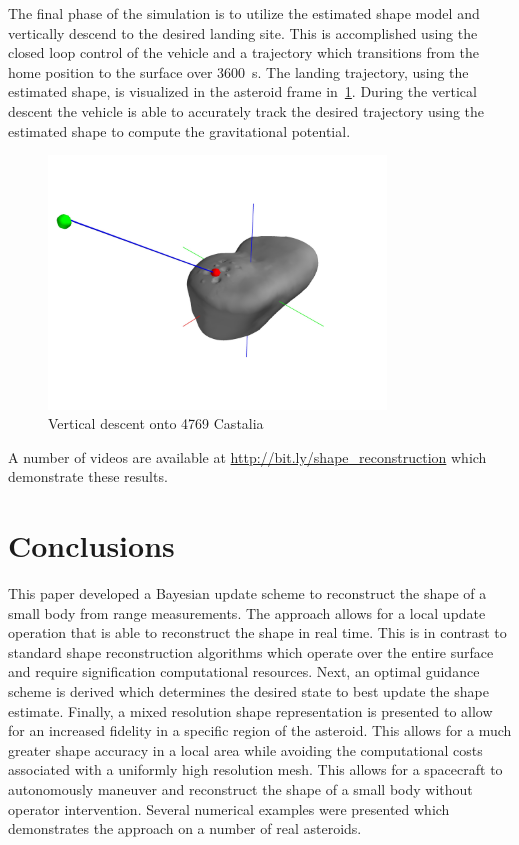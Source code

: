 \documentclass[journal]{new-aiaa}
\newcommand{\todo}[1]{\vspace{5 mm}\par \noindent
\marginpar{\textsc{ToDo}} \framebox{\begin{minipage}[c]{0.95
\textwidth} \tt #1 \end{minipage}}\vspace{5 mm}\par}
\begin{document}
The final phase of the simulation is to utilize the estimated shape model and vertically descend to the desired landing site. 
This is accomplished using the closed loop control of the vehicle and a trajectory which transitions from the home position to the surface over \SI{3600}{\second}.
The landing trajectory, using the estimated shape, is visualized in the asteroid frame in~\cref{fig:castalia_landing}.
During the vertical descent the vehicle is able to accurately track the desired trajectory using the estimated shape to compute the gravitational potential.
\begin{figure}[htbp]
    \centering
    \includegraphics[width=0.8\textwidth]{figures/dynamic_exploration/castalia/land/asteroid_trajectory.jpg}
    \caption{Vertical descent onto 4769 Castalia~\label{fig:castalia_landing}}
\end{figure}
A number of videos are available at \url{http://bit.ly/shape_reconstruction} which demonstrate these results.

\section{Conclusions}

This paper developed a Bayesian update scheme to reconstruct the shape of a small body from range measurements. 
The approach allows for a local update operation that is able to reconstruct the shape in real time. 
This is in contrast to standard shape reconstruction algorithms which operate over the entire surface and require signification computational resources.
Next, an optimal guidance scheme is derived which determines the desired state to best update the shape estimate. 
Finally, a mixed resolution shape representation is presented to allow for an increased fidelity in a specific region of the asteroid.
This allows for a much greater shape accuracy in a local area while avoiding the computational costs associated with a uniformly high resolution mesh.
This allows for a spacecraft to autonomously maneuver and reconstruct the shape of a small body without operator intervention.
Several numerical examples were presented which demonstrates the approach on a number of real asteroids.
\end{document}
